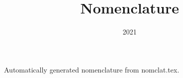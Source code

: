 \documentclass{article}
\title{Nomenclature}
\author{}
\date{2021}
\begin{document}
\maketitle
Automatically generated nomenclature from nomclat.tex.
%

\end{document}
